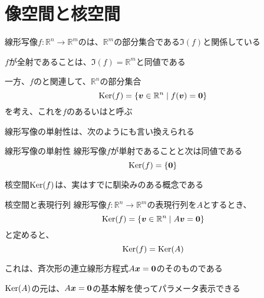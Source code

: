 \documentclass[../../../topic_linear-algebra]{subfiles}
\begin{document}
\sectionline
\section{像空間と核空間}

線形写像$f\colon \mathbb{R}^n \to \mathbb{R}^m$のは、$\mathbb{R}^m$の部分集合である$\Im(f)$と関係している

$f$が全射であることは、$\Im(f) = \mathbb{R}^m$と同値である

\sectionline

一方、$f$のと関連して、$\mathbb{R}^n$の部分集合
\begin{equation*}
  \operatorname{Ker}(f) = \{ \vb*{v} \in \mathbb{R}^n \mid f(\vb*{v}) = \vb*{0} \}
\end{equation*}
を考え、これを$f$のあるいはと呼ぶ

\br

線形写像の単射性は、次のようにも言い換えられる

\begin{theorem}{線形写像の単射性}
  線形写像$f$が単射であることと次は同値である
  \begin{equation*}
    \operatorname{Ker}(f) = \{ \vb*{0} \}
  \end{equation*}
\end{theorem}

\sectionline

核空間$\operatorname{Ker}(f)$は、実はすでに馴染みのある概念である

\begin{theorem}{核空間と表現行列}
  線形写像$f\colon \mathbb{R}^n \to \mathbb{R}^m$の表現行列を$A$とするとき、
  \begin{equation*}
    \operatorname{Ker}(f) = \{ \vb*{v} \in \mathbb{R}^n \mid A\vb*{v} = \vb*{0} \}
  \end{equation*}
  と定めると、
  \begin{equation*}
    \operatorname{Ker}(f) = \operatorname{Ker}(A)
  \end{equation*}
\end{theorem}

これは、斉次形の連立線形方程式$A\vb*{x} = \vb*{0}$のそのものである

\br

$\operatorname{Ker}(A)$の元は、$A\vb*{x} = \vb*{0}$の基本解を使ってパラメータ表示できる
\end{document}
